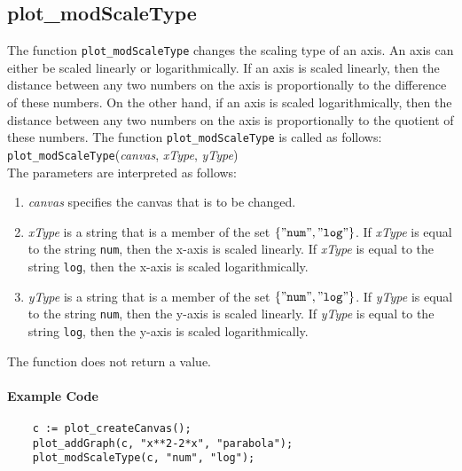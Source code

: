 \subsection{plot\_modScaleType}
The function \texttt{plot\_modScaleType} changes the scaling type of an axis.  An axis can either be
scaled linearly or logarithmically.  If an axis is scaled linearly, then the distance between any two
numbers on the axis is proportionally to the difference of these numbers.  On the other hand, if an
axis is scaled logarithmically, then the distance between any two numbers on the axis is
proportionally to the quotient of these numbers.  The function \texttt{plot\_modScaleType} is called
as follows:
\\[0.2cm]
\hspace*{1.3cm}
\texttt{plot\_modScaleType}(\textsl{canvas}, \textsl{xType}, \textsl{yType})
\\[0.2cm]
The parameters are interpreted as follows:
\begin{enumerate}
\item \textsl{canvas} specifies the canvas that is to be changed.
\item \textsl{xType} is a string that is a member of the set $\{ \mathtt{\symbol{34}num\symbol{34}}, \mathtt{\symbol{34}log\symbol{34}} \}$.
      If \textsl{xType} is equal to the string \texttt{num}, then the x-axis
      is scaled linearly. If \textsl{xType} is equal to the string \texttt{log}, then the x-axis
      is scaled logarithmically.
\item \textsl{yType} is a string that is a member of the set $\{ \mathtt{\symbol{34}num\symbol{34}}, \mathtt{\symbol{34}log\symbol{34}} \}$.
      If \textsl{yType} is equal to the string \texttt{num}, then the y-axis
      is scaled linearly. If \textsl{yType} is equal to the string \texttt{log}, then the y-axis
      is scaled logarithmically.
\end{enumerate}
The function does not return a value.

\paragraph{Example Code}
\begin{verbatim}
    c := plot_createCanvas();
    plot_addGraph(c, "x**2-2*x", "parabola");
    plot_modScaleType(c, "num", "log");
\end{verbatim}

